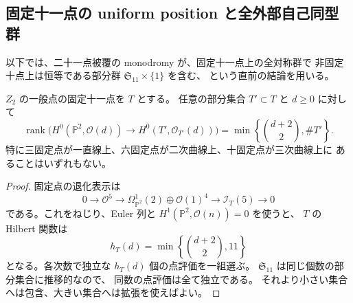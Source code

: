 \subsection{固定十一点の uniform position と全外部自己同型群}
\label{subsec:master-intrinsic-v25}

以下では、二十一点被覆の monodromy が、固定十一点上の全対称群で
非固定十点上は恒等である部分群 $\mathfrak S_{11}\times\{1\}$ を含む、
という直前の結論を用いる。

\begin{proposition}
\label{prop:fixed-eleven-uniform-v25}
$Z_2$ の一般点の固定十一点を $T$ とする。
任意の部分集合 $T'\subset T$ と $d\ge0$ に対して
\[
 \operatorname{rank}\bigl(H^0(\mathbb P^2,\mathcal O(d))
       \longrightarrow H^0(T',\mathcal O_{T'}(d))\bigr)
 =\min\left\{\binom{d+2}{2},\#T'\right\}.
\]
特に三固定点が一直線上、六固定点が二次曲線上、十固定点が三次曲線上に
あることはいずれもない。
\end{proposition}
\begin{proof}
固定点の退化表示は
\[
 0\longrightarrow\mathcal O^5
 \longrightarrow \Omega^1_{\mathbb P^2}(2)\oplus\mathcal O(1)^4
 \longrightarrow\mathcal I_T(5)\longrightarrow0
\]
である。これをねじり、Euler 列と
$H^1(\mathbb P^2,\mathcal O(n))=0$ を使うと、
$T$ の Hilbert 関数は
\[
 h_T(d)=\min\left\{\binom{d+2}{2},11\right\}
\]
となる。各次数で独立な $h_T(d)$ 個の点評価を一組選ぶ。
$\mathfrak S_{11}$ は同じ個数の部分集合に推移的なので、
同数の点評価は全て独立である。
それより小さい集合へは包含、大きい集合へは拡張を使えばよい。
\end{proof}

